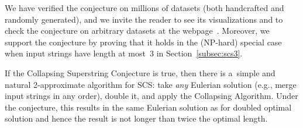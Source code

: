 We have verified the conjecture on millions of datasets (both handcrafted and randomly generated), and we invite the reader to see its visualizations and to check the conjecture on arbitrary datasets at the webpage~\cite{webpage}. 
Moreover, 
we support the conjecture by proving that it holds in the (NP-hard) special case when input strings have length at most~3 in Section~\ref{subsec:scs3}.





If the Collapsing Superstring Conjecture is true, then there is a~simple and natural 2-approximate algorithm for SCS: take {\em any} Eulerian solution (e.g., merge input strings in any order), double it, and apply the Collapsing Algorithm. Under the conjecture, this results in the same Eulerian solution as for doubled optimal solution and hence the result is not longer than twice the optimal length. 





